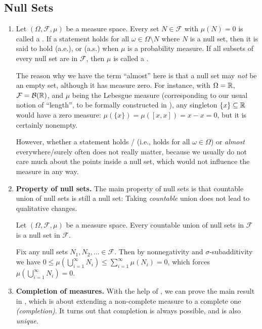 \subsection{Null Sets}
\label{subsect:null-sets}
\begin{enumerate}
\item Let \((\Omega,\mathcal{F},\mu)\) be a measure space. Every set
\(N\in\mathcal{F}\) with \(\mu(N)=0\) is called a . If
a statement holds for all \(\omega\in\Omega\setminus N\) where \(N\) is a null
set, then it is said to hold  (a.e.), or
 (a.s.) when \(\mu\) is a probability measure.
If all subsets of every null set are in \(\mathcal{F}\), then \(\mu\) is called
a .

The reason why we have the term ``almost'' here is that a null set may
\emph{not} be an empty set, although it has measure zero. For instance, with
\(\Omega=\mathbb{R}\), \(\mathcal{F}=\mathcal{B}(\mathbb{R})\), and \(\mu\) being the Lebesgue
measure (corresponding to our usual notion of ``length'', to be formally
constructed in ), any singleton \(\{x\}\subseteq
\mathbb{R}\) would have a zero measure: \(\mu(\{x\})=\mu([x,x])=x-x=0\), but it is
certainly nonempty.

However, whether a statement holds / (i.e., holds
for all \(\omega\in\Omega\)) or \emph{almost} everywhere/surely often does not
really matter, because we usually do not care much about the points inside a
null set, which would not influence the measure in any way.

\item \textbf{Property of null sets.} The main property of null sets is that
countable union of null sets is still a null set: Taking \emph{countable} union
does not lead to qualitative changes.

\begin{lemma}
\label{lma:count-union-null}
Let \((\Omega,\mathcal{F},\mu)\) be a measure space. Every countable union of null
sets in \(\mathcal{F}\) is a null set in \(\mathcal{F}\).
\end{lemma}
\begin{pf}
Fix any null sets \(N_1,N_2,\dotsc\in\mathcal{F}\). Then by nonnegativity and
\(\sigma\)-subadditivity we have \(0\le\mu(\bigcup_{i=1}^{\infty}N_i)
\le\sum_{i=1}^{\infty}\mu(N_i)=0\), which forces \(\mu(\bigcup_{i=1}^{\infty}N_i)=0\).
\end{pf}
\item \textbf{Completion of measures.}
With the help of , we can prove the main result in
, which is about extending a non-complete measure to a
complete one \emph{(completion)}. It turns out that completion is always
possible, and is also \emph{unique}.


\end{enumerate}
